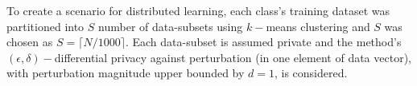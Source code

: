 To create a scenario for distributed learning, each class's training dataset was partitioned into $S$ number of data-subsets using $k-$means clustering and $S$ was chosen as $S =\lceil N/1000 \rceil$. Each data-subset is assumed private and the method's $(\epsilon,\delta)-$differential privacy against perturbation (in one element of data vector), with perturbation magnitude upper bounded by $d = 1$, is considered.
\begin{figure}
\centerline{  \hfil {}}
\centerline{  \hfil {}}
\centerline{  \hfil {}}

\end{figure}
